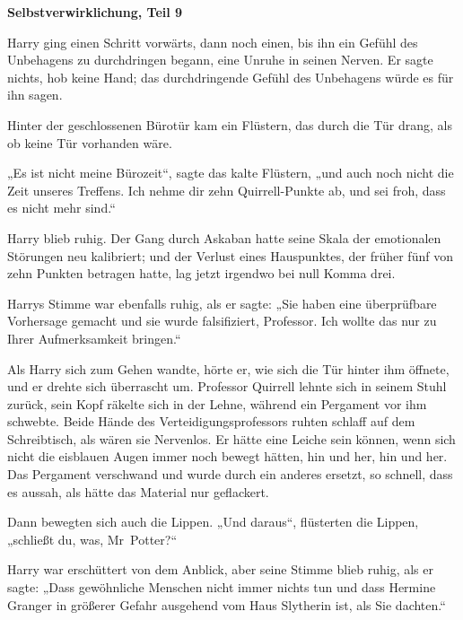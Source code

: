 

\hypertarget{selbstverwirklichung-teil-9}{%

\textbf{Selbstverwirklichung, Teil 9}

Harry ging einen Schritt vorwärts, dann noch einen, bis ihn ein Gefühl des Unbehagens zu durchdringen begann, eine Unruhe in seinen Nerven. Er sagte nichts, hob keine Hand; das durchdringende Gefühl des Unbehagens würde es für ihn sagen.

Hinter der geschlossenen Bürotür kam ein Flüstern, das durch die Tür drang, als ob keine Tür vorhanden wäre.

„Es ist nicht meine Bürozeit“, sagte das kalte Flüstern, „und auch noch nicht die Zeit unseres Treffens. Ich nehme dir zehn Quirrell-Punkte ab, und sei froh, dass es nicht mehr sind.“

Harry blieb ruhig. Der Gang durch Askaban hatte seine Skala der emotionalen Störungen neu kalibriert; und der Verlust eines Hauspunktes, der früher fünf von zehn Punkten betragen hatte, lag jetzt irgendwo bei null Komma drei.

Harrys Stimme war ebenfalls ruhig, als er sagte: „Sie haben eine überprüfbare Vorhersage gemacht und sie wurde falsifiziert, Professor. Ich wollte das nur zu Ihrer Aufmerksamkeit bringen.“

Als Harry sich zum Gehen wandte, hörte er, wie sich die Tür hinter ihm öffnete, und er drehte sich überrascht um. Professor Quirrell lehnte sich in seinem Stuhl zurück, sein Kopf räkelte sich in der Lehne, während ein Pergament vor ihm schwebte. Beide Hände des Verteidigungsprofessors ruhten schlaff auf dem Schreibtisch, als wären sie Nervenlos. Er hätte eine Leiche sein können, wenn sich nicht die eisblauen Augen immer noch bewegt hätten, hin und her, hin und her. Das Pergament verschwand und wurde durch ein anderes ersetzt, so schnell, dass es aussah, als hätte das Material nur geflackert.

Dann bewegten sich auch die Lippen. „Und daraus“, flüsterten die Lippen, „schließt du, was, Mr~Potter?“

Harry war erschüttert von dem Anblick, aber seine Stimme blieb ruhig, als er sagte: „Dass gewöhnliche Menschen nicht immer nichts tun und dass Hermine Granger in größerer Gefahr ausgehend vom Haus Slytherin ist, als Sie dachten.“

}
